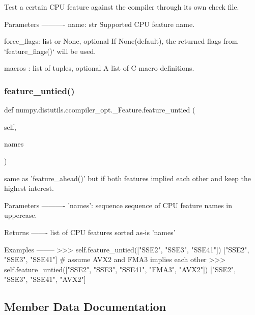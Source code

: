 \begin{DoxyVerb}Test a certain CPU feature against the compiler through its own
check file.

Parameters
----------
name: str
    Supported CPU feature name.

force_flags: list or None, optional
    If None(default), the returned flags from `feature_flags()`
    will be used.

macros : list of tuples, optional
    A list of C macro definitions.
\end{DoxyVerb}
 \mbox{\label{classnumpy_1_1distutils_1_1ccompiler__opt_1_1__Feature_a71b3eb9d29aca4f71e06b8bfba1cf043}} 
\subsubsection{\texorpdfstring{feature\+\_\+untied()}{feature\_untied()}}
{\footnotesize\ttfamily def numpy.\+distutils.\+ccompiler\+\_\+opt.\+\_\+\+Feature.\+feature\+\_\+untied (\begin{DoxyParamCaption}\item[{}]{self,  }\item[{}]{names }\end{DoxyParamCaption})}

\begin{DoxyVerb}same as 'feature_ahead()' but if both features implied each other
and keep the highest interest.

Parameters
----------
'names': sequence
    sequence of CPU feature names in uppercase.

Returns
-------
list of CPU features sorted as-is 'names'

Examples
--------
>>> self.feature_untied(["SSE2", "SSE3", "SSE41"])
["SSE2", "SSE3", "SSE41"]
# assume AVX2 and FMA3 implies each other
>>> self.feature_untied(["SSE2", "SSE3", "SSE41", "FMA3", "AVX2"])
["SSE2", "SSE3", "SSE41", "AVX2"]
\end{DoxyVerb}
 

\subsection{Member Data Documentation}
\mbox{\label{classnumpy_1_1distutils_1_1ccompiler__opt_1_1__Feature_a722943b73603d5d9cae00a7bca16a556}} 
